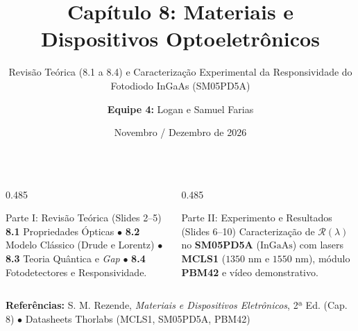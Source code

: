 \documentclass[aspectratio=169, 9pt]{beamer}
\title[Tema 4: Optoeletrônica e Fotodetectores]{\textbf{Capítulo 8: Materiais e Dispositivos Optoeletrônicos}}
\subtitle{Revisão Teórica (8.1 a 8.4) e Caracterização Experimental da Responsividade do Fotodiodo InGaAs (SM05PD5A)}
\author[Equipe 4: Logan e Samuel Farias]{\textbf{Equipe 4:} Logan e Samuel Farias}
\institute[Materiais Eletrônicos e Optoeletrônicos]{%
  Disciplina: Materiais Eletrônicos e Optoeletrônicos $\bullet$ 2ª Avaliação --- Seminários
}
\date{Novembro / Dezembro de 2026}
\begin{document}
\setlength{\abovedisplayskip}{3pt}
\setlength{\belowdisplayskip}{3pt}

\begin{frame}
  \vspace{-0.2cm}
  \titlepage
  \vspace{-0.45cm}
  \begin{columns}[T, onlytextwidth]
    \begin{column}{0.485\textwidth}
      \begin{block}{\footnotesize Parte I: Revisão Teórica (Slides 2--5)}
        \scriptsize
        \textbf{8.1} Propriedades Ópticas $\bullet$ \textbf{8.2} Modelo Clássico (Drude e Lorentz) $\bullet$ \textbf{8.3} Teoria Quântica e \textit{Gap} $\bullet$ \textbf{8.4} Fotodetectores e Responsividade.
      \end{block}
    \end{column}
    \begin{column}{0.485\textwidth}
      \begin{alertblock}{\footnotesize Parte II: Experimento e Resultados (Slides 6--10)}
        \scriptsize
        Caracterização de $\mathcal{R}(\lambda)$ no \textbf{SM05PD5A} ($\text{InGaAs}$) com lasers \textbf{MCLS1} ($1350\text{ nm}$ e $1550\text{ nm}$), módulo \textbf{PBM42} e vídeo demonstrativo.
      \end{alertblock}
    \end{column}
  \end{columns}
  \vspace{0.1cm}
  \begin{center}
    \scriptsize \textcolor{SecondaryBlue}{\textbf{Referências:} S. M. Rezende, \textit{Materiais e Dispositivos Eletrônicos}, 2ª Ed. (Cap. 8) $\bullet$ Datasheets Thorlabs (MCLS1, SM05PD5A, PBM42)}
  \end{center}
\end{frame}
\end{document}
